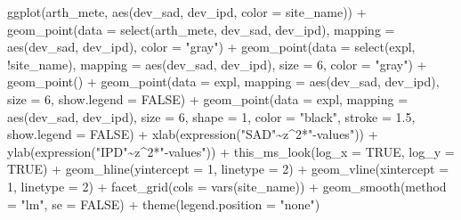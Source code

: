 \documentclass[
  letterpaper,
  DIV=11,
  numbers=noendperiod]{scrartcl}
\newenvironment{Shaded}{\begin{snugshade}}{\end{snugshade}}
\newcommand{\AttributeTok}[1]{\textcolor[rgb]{0.40,0.45,0.13}{#1}}
\newcommand{\ConstantTok}[1]{\textcolor[rgb]{0.56,0.35,0.01}{#1}}
\newcommand{\DecValTok}[1]{\textcolor[rgb]{0.68,0.00,0.00}{#1}}
\newcommand{\FloatTok}[1]{\textcolor[rgb]{0.68,0.00,0.00}{#1}}
\newcommand{\FunctionTok}[1]{\textcolor[rgb]{0.28,0.35,0.67}{#1}}
\newcommand{\NormalTok}[1]{\textcolor[rgb]{0.00,0.23,0.31}{#1}}
\newcommand{\SpecialCharTok}[1]{\textcolor[rgb]{0.37,0.37,0.37}{#1}}
\newcommand{\StringTok}[1]{\textcolor[rgb]{0.13,0.47,0.30}{#1}}
\begin{document}
\begin{Shaded}
\begin{Highlighting}[]
\FunctionTok{ggplot}\NormalTok{(arth\_mete, }\FunctionTok{aes}\NormalTok{(dev\_sad, dev\_ipd, }\AttributeTok{color =}\NormalTok{ site\_name)) }\SpecialCharTok{+}
    \FunctionTok{geom\_point}\NormalTok{(}\AttributeTok{data =} \FunctionTok{select}\NormalTok{(arth\_mete, dev\_sad, dev\_ipd),}
               \AttributeTok{mapping =} \FunctionTok{aes}\NormalTok{(dev\_sad, dev\_ipd), }\AttributeTok{color =} \StringTok{"gray"}\NormalTok{) }\SpecialCharTok{+}
    \FunctionTok{geom\_point}\NormalTok{(}\AttributeTok{data =} \FunctionTok{select}\NormalTok{(expl, }\SpecialCharTok{!}\NormalTok{site\_name), }
               \AttributeTok{mapping =} \FunctionTok{aes}\NormalTok{(dev\_sad, dev\_ipd), }
               \AttributeTok{size =} \DecValTok{6}\NormalTok{, }\AttributeTok{color =} \StringTok{"gray"}\NormalTok{) }\SpecialCharTok{+}
    \FunctionTok{geom\_point}\NormalTok{() }\SpecialCharTok{+}
    \FunctionTok{geom\_point}\NormalTok{(}\AttributeTok{data =}\NormalTok{ expl,}
               \AttributeTok{mapping =} \FunctionTok{aes}\NormalTok{(dev\_sad, dev\_ipd),}
               \AttributeTok{size =} \DecValTok{6}\NormalTok{,}
               \AttributeTok{show.legend =} \ConstantTok{FALSE}\NormalTok{) }\SpecialCharTok{+}
    \FunctionTok{geom\_point}\NormalTok{(}\AttributeTok{data =}\NormalTok{ expl,}
               \AttributeTok{mapping =} \FunctionTok{aes}\NormalTok{(dev\_sad, dev\_ipd),}
               \AttributeTok{size =} \DecValTok{6}\NormalTok{, }\AttributeTok{shape =} \DecValTok{1}\NormalTok{, }\AttributeTok{color =} \StringTok{"black"}\NormalTok{,}
               \AttributeTok{stroke =} \FloatTok{1.5}\NormalTok{,}
               \AttributeTok{show.legend =} \ConstantTok{FALSE}\NormalTok{) }\SpecialCharTok{+}
    \FunctionTok{xlab}\NormalTok{(}\FunctionTok{expression}\NormalTok{(}\StringTok{"SAD"}\SpecialCharTok{\textasciitilde{}}\NormalTok{z}\SpecialCharTok{\^{}}\DecValTok{2}\SpecialCharTok{*}\StringTok{"{-}values"}\NormalTok{)) }\SpecialCharTok{+}
    \FunctionTok{ylab}\NormalTok{(}\FunctionTok{expression}\NormalTok{(}\StringTok{"IPD"}\SpecialCharTok{\textasciitilde{}}\NormalTok{z}\SpecialCharTok{\^{}}\DecValTok{2}\SpecialCharTok{*}\StringTok{"{-}values"}\NormalTok{)) }\SpecialCharTok{+}
    \FunctionTok{this\_ms\_look}\NormalTok{(}\AttributeTok{log\_x =} \ConstantTok{TRUE}\NormalTok{, }\AttributeTok{log\_y =} \ConstantTok{TRUE}\NormalTok{) }\SpecialCharTok{+}
    \FunctionTok{geom\_hline}\NormalTok{(}\AttributeTok{yintercept =} \DecValTok{1}\NormalTok{, }\AttributeTok{linetype =} \DecValTok{2}\NormalTok{) }\SpecialCharTok{+}
    \FunctionTok{geom\_vline}\NormalTok{(}\AttributeTok{xintercept =} \DecValTok{1}\NormalTok{, }\AttributeTok{linetype =} \DecValTok{2}\NormalTok{) }\SpecialCharTok{+}
    \FunctionTok{facet\_grid}\NormalTok{(}\AttributeTok{cols =} \FunctionTok{vars}\NormalTok{(site\_name)) }\SpecialCharTok{+}
    \FunctionTok{geom\_smooth}\NormalTok{(}\AttributeTok{method =} \StringTok{"lm"}\NormalTok{, }\AttributeTok{se =} \ConstantTok{FALSE}\NormalTok{) }\SpecialCharTok{+}
    \FunctionTok{theme}\NormalTok{(}\AttributeTok{legend.position =} \StringTok{"none"}\NormalTok{)}
\end{Highlighting}
\end{Shaded}
\end{document}
